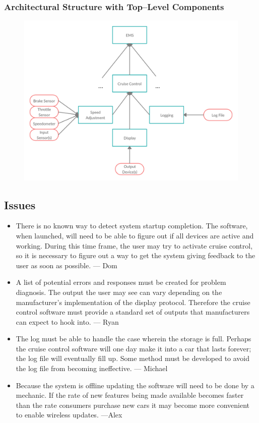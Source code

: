 \documentclass{article}
\begin{document}
	\newpage
	\subsubsection{Architectural Structure with Top--Level Components}
	\begin{figure}[!htb]
		\centering
		\includegraphics[scale=.28]{cs347_5b}
	\end{figure}
	
	\subsection{Issues}
	\begin{itemize}
		\item There is no known way to detect system startup completion. The software, when launched, will need to be able to figure out if all devices are active and working. During this time frame, the user may try to activate cruise control, so it is necessary to figure out a way to get the system giving feedback to the user as soon as possible. --- Dom
		\item A list of potential errors and responses must be created for problem diagnosis. The output the user may see can vary depending on the manufacturer's implementation of the display protocol. Therefore the cruise control software must provide a standard set of outputs that manufacturers can expect to hook into. --- Ryan
		\item The log must be able to handle the case wherein the storage is full. Perhaps the cruise control software will one day make it into a car that lasts forever; the log file will eventually fill up. Some method must be developed to avoid the log file from becoming ineffective. --- Michael
		\item Because the system is offline updating the software will need to be done by a mechanic. If the rate of new features being made available becomes faster than the rate consumers purchase new cars it may become more convenient to enable wireless updates. ---Alex
	\end{itemize}
	
\end{document}
